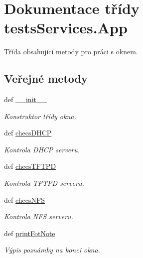 \hypertarget{classtestsServices_1_1App}{\section{Dokumentace třídy tests\-Services.\-App}
\label{d7/df4/classtestsServices_1_1App}
}


Třída obsahující metody pro práci s oknem.  


\subsection*{Veřejné metody}
\begin{DoxyCompactItemize}
\item 
def \hyperlink{classtestsServices_1_1App_a4d2ff021b8573c106ee06d6da3617d02}{\-\_\-\-\_\-init\-\_\-\-\_\-}
\begin{DoxyCompactList}\small\item\em Konstruktor třídy okna. \end{DoxyCompactList}\item 
def \hyperlink{classtestsServices_1_1App_a4acc1a5befecee39711813f3385d946d}{checs\-D\-H\-C\-P}
\begin{DoxyCompactList}\small\item\em Kontrola D\-H\-C\-P serveru. \end{DoxyCompactList}\item 
def \hyperlink{classtestsServices_1_1App_a1588a5d7b9e0667092655283d73184ab}{checs\-T\-F\-T\-P\-D}
\begin{DoxyCompactList}\small\item\em Kontrola T\-F\-T\-P\-D serveru. \end{DoxyCompactList}\item 
def \hyperlink{classtestsServices_1_1App_a55f0881d655f493701d352f8bda17920}{checs\-N\-F\-S}
\begin{DoxyCompactList}\small\item\em Kontrola N\-F\-S serveru. \end{DoxyCompactList}\item 
def \hyperlink{classtestsServices_1_1App_a40605ee769c4f38b5f5e03f145a59add}{print\-Fot\-Note}
\begin{DoxyCompactList}\small\item\em Výpis poznámky na konci okna. \end{DoxyCompactList}\end{DoxyCompactItemize}
